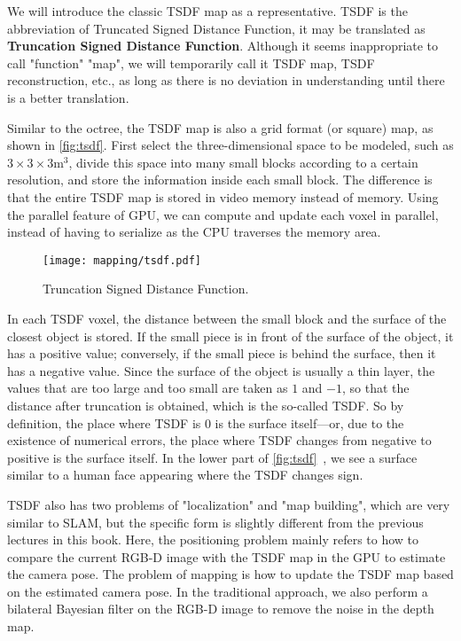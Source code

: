 We will introduce the classic TSDF map as a representative. TSDF is the abbreviation of Truncated Signed Distance Function, it may be translated as \textbf{Truncation Signed Distance Function}. Although it seems inappropriate to call "function" "map", we will temporarily call it TSDF map, TSDF reconstruction, etc., as long as there is no deviation in understanding until there is a better translation.

Similar to the octree, the TSDF map is also a grid format (or square) map, as shown in \autoref{fig:tsdf}. First select the three-dimensional space to be modeled, such as $3\times3\times3 \text{m}^3$, divide this space into many small blocks according to a certain resolution, and store the information inside each small block. The difference is that the entire TSDF map is stored in video memory instead of memory. Using the parallel feature of GPU, we can compute and update each voxel in parallel, instead of having to serialize as the CPU traverses the memory area.

\begin{figure}[!t]
	\centering
	\texttt{[image: mapping/tsdf.pdf]}
	\caption{Truncation Signed Distance Function.}
	\label{fig:tsdf}
\end{figure}

In each TSDF voxel, the distance between the small block and the surface of the closest object is stored. If the small piece is in front of the surface of the object, it has a positive value; conversely, if the small piece is behind the surface, then it has a negative value. Since the surface of the object is usually a thin layer, the values that are too large and too small are taken as $1$ and $-1$, so that the distance after truncation is obtained, which is the so-called TSDF. So by definition, the place where TSDF is 0 is the surface itself—or, due to the existence of numerical errors, the place where TSDF changes from negative to positive is the surface itself. In the lower part of \autoref{fig:tsdf}~, we see a surface similar to a human face appearing where the TSDF changes sign.

TSDF also has two problems of "localization" and "map building", which are very similar to SLAM, but the specific form is slightly different from the previous lectures in this book. Here, the positioning problem mainly refers to how to compare the current RGB-D image with the TSDF map in the GPU to estimate the camera pose. The problem of mapping is how to update the TSDF map based on the estimated camera pose. In the traditional approach, we also perform a bilateral Bayesian filter on the RGB-D image to remove the noise in the depth map.

